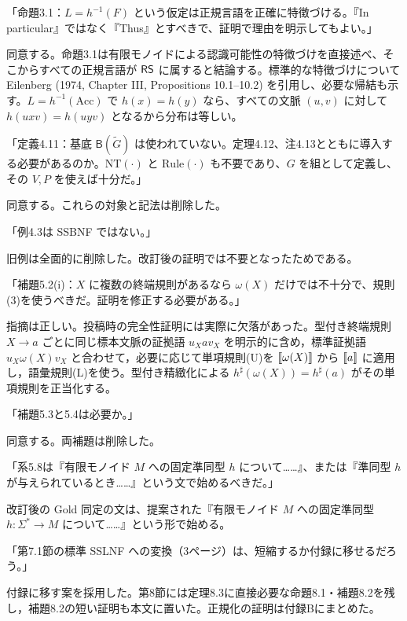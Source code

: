 「命題3.1：$L=h^{-1}(F)$ という仮定は正規言語を正確に特徴づける。『In particular』ではなく『Thus』とすべきで、証明で理由を明示してもよい。」

\Reply
同意する。命題3.1は有限モノイドによる認識可能性の特徴づけを直接述べ、そこからすべての正規言語が $\mathsf{RS}$ に属すると結論する。標準的な特徴づけについて Eilenberg (1974, Chapter III, Propositions 10.1--10.2) を引用し、必要な帰結も示す。$L=h^{-1}(\mathrm{Acc})$ で $h(x)=h(y)$ なら、すべての文脈 $(u,v)$ に対して $h(uxv)=h(uyv)$ となるから分布は等しい。

「定義4.11：基底 $\mathsf B(\widetilde G)$ は使われていない。定理4.12、注4.13とともに導入する必要があるのか。$\mathrm{NT}(\cdot)$ と $\mathrm{Rule}(\cdot)$ も不要であり、$G$ を組として定義し、その $V,P$ を使えば十分だ。」

\Reply
同意する。これらの対象と記法は削除した。

「例4.3は SSBNF ではない。」

\Reply
旧例は全面的に削除した。改訂後の証明では不要となったためである。

「補題5.2(i)：$X$ に複数の終端規則があるなら $\omega(X)$ だけでは不十分で、規則(3)を使うべきだ。証明を修正する必要がある。」

\Reply
指摘は正しい。投稿時の完全性証明には実際に欠落があった。型付き終端規則 $X\to a$ ごとに同じ標本文脈の証拠語 $u_Xav_X$ を明示的に含め，標準証拠語 $u_X\omega(X)v_X$ と合わせて，必要に応じて単項規則(U)を $\llbracket \omega(X)\rrbracket$ から $\llbracket a\rrbracket$ に適用し，語彙規則(L)を使う。型付き精緻化による $h^\sharp(\omega(X))=h^\sharp(a)$ がその単項規則を正当化する。

「補題5.3と5.4は必要か。」

\Reply
同意する。両補題は削除した。

「系5.8は『有限モノイド $M$ への固定準同型 $h$ について……』、または『準同型 $h$ が与えられているとき……』という文で始めるべきだ。」

\Reply
改訂後の Gold 同定の文は、提案された『有限モノイド $M$ への固定準同型 $h:\Sigma^*\to M$ について……』という形で始める。

「第7.1節の標準 SSLNF への変換（3ページ）は、短縮するか付録に移せるだろう。」

\Reply
付録に移す案を採用した。第8節には定理8.3に直接必要な命題8.1・補題8.2を残し，補題8.2の短い証明も本文に置いた。正規化の証明は付録Bにまとめた。
